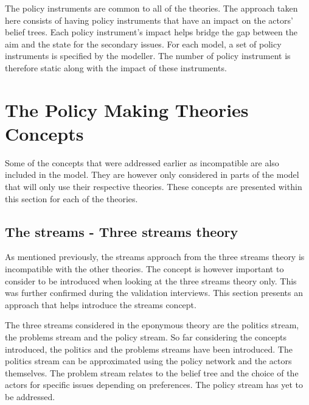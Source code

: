 The policy instruments are common to all of the theories. The approach taken here consists of having policy instruments that have an impact on the actors' belief trees. Each policy instrument's impact helps bridge the gap between the aim and the state for the secondary issues. For each model, a set of policy instruments is specified by the modeller. The number of policy instrument is therefore static along with the impact of these instruments.

%
\section{The Policy Making Theories Concepts}
\label{sec:PMTConcepts}

Some of the concepts that were addressed earlier as incompatible are also included in the model. They are however only considered in parts of the model that will only use their respective theories. These concepts are presented within this section for each of the theories.

%
\subsection{The streams - Three streams theory}
\label{ssec:policyInstrumentTree3S}

As mentioned previously, the streams approach from the three streams theory is incompatible with the other theories. The concept is however important to consider to be introduced when looking at the three streams theory only. This was further confirmed during the validation interviews. This section presents an approach that helps introduce the streams concept.

The three streams considered in the eponymous theory are the politics stream, the problems stream and the policy stream. So far considering the concepts introduced, the politics and the problems streams have been introduced. The politics stream can be approximated using the policy network and the actors themselves. The problem stream relates to the belief tree and the choice of the actors for specific issues depending on preferences. The policy stream has yet to be addressed.

